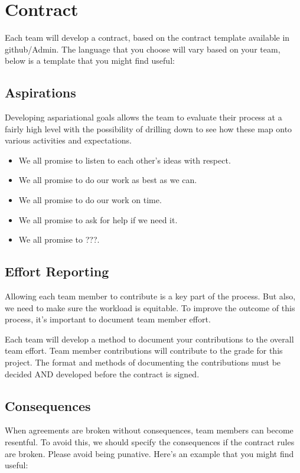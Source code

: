 \documentclass{article}\usepackage[]{graphicx}\usepackage[]{color}
\begin{document}
\section{Contract}

Each team will develop a contract, based on the contract template available in github/Admin. The language that you choose will vary based on your team, below is a template that you might find useful:

\subsection{Aspirations}

Developing aspariational goals allows the team to evaluate their process at a fairly high level with the possibility of drilling down to see how these map onto various activities and expectations. 

\begin{itemize}
  \item We all promise to listen to each other's ideas with respect.
  \item We all promise to do our work as best as we can.
  \item We all promise to do our work on time.
  \item We all promise to ask for help if we need it.
  \item We all promise to ???.
\end{itemize}

\subsection{Effort Reporting}

Allowing each team member to contribute is a key part of the process. But also, we need to make sure the workload is equitable. To improve the outcome of this process, it's important to document team member effort.

Each team will develop a method to document your contributions to the overall team effort. Team member contributions will contribute to the grade for this project. The format and methods of documenting the contributions must be decided AND developed before the contract is signed.

\subsection{Consequences}

When agreements are broken without consequences, team members can become resentful. To avoid this, we should specify the consequences if the contract rules are broken. Please avoid being punative. Here's an example that you might find useful:
\end{document}
